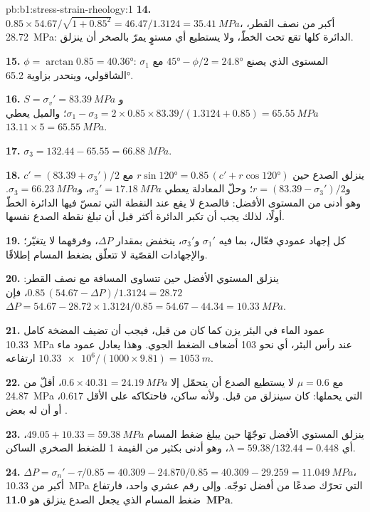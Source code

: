 \begin{solution}{pb:b1:stress-strain-rheology:1}
\textbf{14.} $0.85\times54.67/\sqrt{1 + 0.85^2} = 46.47/1.3124 =
\qty{35.41}{MPa}$، أكبر من نصف القطر، \qty{28.72}{MPa}: الدائرة كلها
تقع تحت الخطّ، ولا يستطيع أي مستوٍ يمرّ بالصخر أن ينزلق.

\textbf{15.} $\phi = \arctan0.85 = \ang{40.36}$: المستوى الذي يصنع
$\ang{45} - \phi/2 = \ang{24.8}$ مع $\sigma_1$ الشاقولي، وينحدر بزاوية
\ang{65.2}.

\textbf{16.} $S = \sigma_v' = \qty{83.39}{MPa}$ و
$\sigma_1 - \sigma_3 = 2\times0.85\times83.39/(1.3124 + 0.85) =
\qty{65.55}{MPa}$؛ والميل يعطي $13.11\times5 = \qty{65.55}{MPa}$.

\textbf{17.} $\sigma_3 = 132.44 - 65.55 = \qty{66.88}{MPa}$.

\textbf{18.} ينزلق الصدع حين
$r\sin\ang{120} = 0.85\,(c' + r\cos\ang{120})$ مع
$c' = (83.39 + \sigma_3')/2$ و$r = (83.39 - \sigma_3')/2$؛ وحلّ المعادلة يعطي
$\sigma_3' = \qty{17.18}{MPa}$، و$\sigma_3 = \qty{66.23}{MPa}$. وهو أدنى
من المستوى الأفضل: فالصدع لا يقع عند النقطة التي تمسّ فيها الدائرة الخطّ أولًا،
لذلك يجب أن تكبر الدائرة أكثر قبل أن تبلغ نقطة الصدع نفسها.

\textbf{19.} كل إجهاد عمودي فعّال، بما فيه $\sigma_1'$ و$\sigma_3'$، ينخفض بمقدار $\Delta P$، وفرقهما لا يتغيّر؛ والإجهادات القصّية لا تتعلّق بضغط المسام إطلاقًا.

\textbf{20.} ينزلق المستوي الأفضل حين تتساوى المسافة مع نصف القطر:
$0.85\,(54.67 - \Delta P)/1.3124 = 28.72$، فإن
$\Delta P = 54.67 - 28.72\times1.3124/0.85 = 54.67 - 44.34 = \qty{10.33}{MPa}$.

\textbf{21.} عمود الماء في البئر يزن كما كان من قبل، فيجب أن تضيف المضخة كامل \qty{10.33}{MPa} عند رأس البئر، أي نحو 103 أضعاف الضغط الجوي. وهذا يعادل عمود ماء ارتفاعه
$\num{10.33e6}/(1000\times9.81) = \qty{1053}{m}$.

\textbf{22.} مع $\mu = 0.6$ لا يستطيع الصدع أن يتحمّل إلا
$0.6\times40.31 = \qty{24.19}{MPa}$، أقلّ من \qty{24.87}{MPa} التي يحملها:
كان سينزلق من قبل. ولأنه ساكن، فاحتكاكه على الأقل $0.617$، أو أن له بعض .

\textbf{23.} ينزلق المستوي الأفضل توجّهًا حين يبلغ ضغط المسام
$49.05 + 10.33 = \qty{59.38}{MPa}$، أي $\lambda = 59.38/132.44 = 0.448$،
وهو أدنى بكثير من القيمة 1 للضغط الصخري الساكن.

\textbf{24.} $\Delta P = \sigma_n' - \tau/0.85 = 40.309 - 24.870/0.85 = 40.309 -
29.259 = \qty{11.049}{MPa}$، أكبر من \qty{10.33}{MPa} التي تحرّك صدعًا
من أفضل توجّه. وإلى رقم عشري واحد، فارتفاع ضغط المسام الذي يجعل الصدع ينزلق هو
\textbf{\qty[text-series-to-math=true]{11.0}{MPa}}.
\end{solution}
